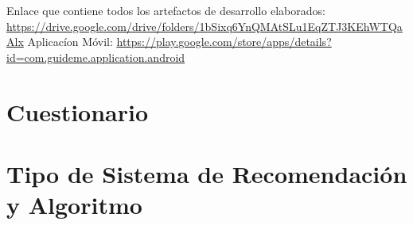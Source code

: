 \documentclass[12pt,letterpaper,openany]{book}
\begin{document}
Enlace que contiene todos los artefactos de desarrollo elaborados: \url{https://drive.google.com/drive/folders/1bSixq6YnQMAtSLu1EqZTJ3KEhWTQaAlx} 
\vspace{5mm}\newline
Aplicacíon Móvil: \url{https://play.google.com/store/apps/details?id=com.guideme.application.android}

\chapter{Cuestionario}\label{aped.B}

\chapter{Tipo de Sistema de Recomendación y Algoritmo}\label{aped.C}
\end{document}
